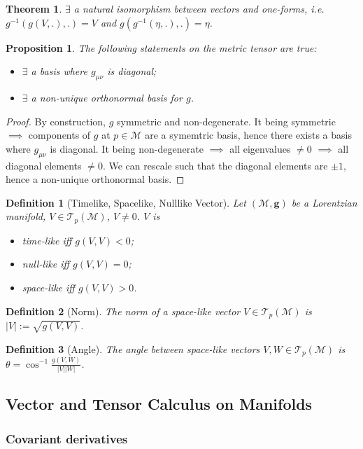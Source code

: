 \documentclass[a4paper]{article}
\theoremstyle{new}
\newtheorem{defi}{Definition}[section]
\newtheorem{thm}{Theorem}[section]
\newtheorem{prop}{Proposition}[section]
\begin{document}
\begin{thm}
$\exists$ a natural isomorphism between vectors and one-forms, i.e. $g^{-1}(g(V,.),.)=V$ and $g(g^{-1}(\eta,.),.)=\eta$.
\end{thm}
\begin{prop}
The following statements on the metric tensor are true:
\begin{itemize}
    \item $\exists$ a basis where $g_{\mu\nu}$ is diagonal;
    \item $\exists$ a non-unique orthonormal basis for $g$.
\end{itemize}
\end{prop}
\begin{proof}
By construction, $g$ symmetric and non-degenerate. It being symmetric $\implies$ components of $g$ at $p\in\mathcal{M}$ are a symemtric basis, hence there exists a basis where $g_{\mu\nu}$ is diagonal. It being non-degenerate $\implies$ all eigenvalues $\neq0$ $\implies$ all diagonal elements $\neq 0$. We can rescale such that the diagonal elements are $\pm1$, hence a non-unique orthonormal basis. 
\end{proof}
\begin{defi}[Timelike, Spacelike, Nulllike Vector]
Let $(\mathcal{M},\mathbf{g})$ be a Lorentzian manifold, $V\in\mathcal{T}_p(\mathcal{M})$, $V\neq0$. $V$ is
\begin{itemize}
    \item time-like iff $g(V,V)<0$;
    \item null-like iff $g(V,V)=0$;
    \item space-like iff
    $g(V,V)>0$.
\end{itemize}
\end{defi}
\begin{defi}[Norm]
The norm of a space-like vector $V\in\mathcal{T}_p(\mathcal{M})$ is $|V|:=\sqrt{g(V,V)}$.
\end{defi}
\begin{defi}[Angle]
The angle between space-like vectors $V,W\in\mathcal{T}_p(\mathcal{M})$ is $\theta=\cos^{-1}\frac{g(V,W)}{|V||W|}$.
\end{defi}
\subsection{Vector and Tensor Calculus on Manifolds}
\subsubsection{Covariant derivatives}
\end{document}
